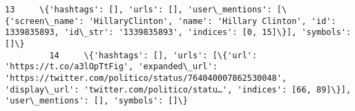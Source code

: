 \documentclass[11pt]{article}
\begin{document}
\begin{Verbatim}[commandchars=\\\{\}]
         13     \{'hashtags': [], 'urls': [], 'user\_mentions': [\{'screen\_name': 'HillaryClinton', 'name': 'Hillary Clinton', 'id': 1339835893, 'id\_str': '1339835893', 'indices': [0, 15]\}], 'symbols': []\}                                                                                                                                                                                                                                                                                                                                                                                                                                                                                                                                                                                                                                                                                                                                                                                                                                                                                                                                                                                                                     
         14     \{'hashtags': [], 'urls': [\{'url': 'https://t.co/a3lOpTtFig', 'expanded\_url': 'https://twitter.com/politico/status/764040007862530048', 'display\_url': 'twitter.com/politico/statu…', 'indices': [66, 89]\}], 'user\_mentions': [], 'symbols': []\}                                                                                                                                                                                                                                                                                                                                                                                                                                                                                                                                                                                                                                                                                                                                                                                                                                                                                                                                                                

\end{Verbatim}
\end{document}
